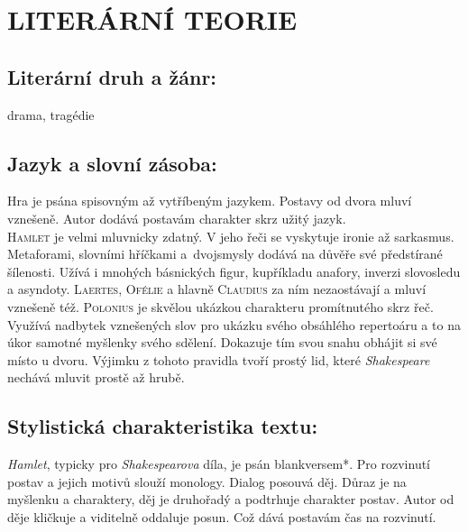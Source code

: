 \documentclass{extarticle} %
\begin{document}
\section*{LITERÁRNÍ TEORIE}

\subsection*{Literární druh a žánr:}
\noindent drama, tragédie


\subsection*{Jazyk a slovní zásoba: }
\noindent Hra je psána spisovným až vytříbeným jazykem.
Postavy od dvora mluví vznešeně.
Autor dodává postavám charakter skrz užitý jazyk. \\
\textsc{Hamlet} je velmi mluvnicky zdatný.
V jeho řeči se vyskytuje ironie až sarkasmus.
Metaforami, slovními hříčkami a~dvojsmysly dodává na důvěře své předstírané šílenosti.
Užívá i mnohých básnických figur, kupříkladu anafory, inverzi slovosledu a asyndoty.
\textsc{Laertes}, \textsc{Ofélie} a hlavně \textsc{Claudius} za ním nezaostávají a mluví vznešeně též.
\textsc{Polonius} je skvělou ukázkou charakteru promítnutého skrz řeč.
Využívá nadbytek vznešených slov pro ukázku svého obsáhlého repertoáru a to na úkor samotné myšlenky svého sdělení.
Dokazuje tím svou snahu obhájit si své místo u dvoru.
Výjimku z tohoto pravidla tvoří prostý lid, které \textit{Shakespeare} nechává mluvit prostě až hrubě.  



\subsection*{Stylistická charakteristika textu: }
\noindent\textit{Hamlet}, typicky pro \textit{Shakespearova} díla, je psán blankversem*.
Pro rozvinutí postav a jejich motivů slouží monology.
Dialog posouvá děj.
Důraz je na myšlenku a charaktery, děj je druhořadý a podtrhuje charakter postav.
Autor od děje kličkuje a viditelně oddaluje posun.
Což dává postavám čas na rozvinutí.
\end{document}
